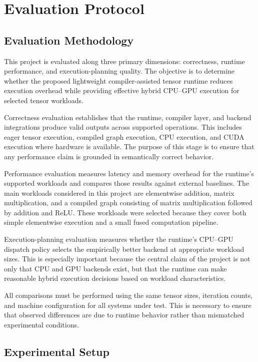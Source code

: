 \documentclass[12pt]{article}
\begin{document}
\section{Evaluation Protocol}

\subsection{Evaluation Methodology}

This project is evaluated along three primary dimensions: correctness, runtime performance, and execution-planning quality. The objective is to determine whether the proposed lightweight compiler-assisted tensor runtime reduces execution overhead while providing effective hybrid CPU--GPU execution for selected tensor workloads.

Correctness evaluation establishes that the runtime, compiler layer, and backend integrations produce valid outputs across supported operations. This includes eager tensor execution, compiled graph execution, CPU execution, and CUDA execution where hardware is available. The purpose of this stage is to ensure that any performance claim is grounded in semantically correct behavior.

Performance evaluation measures latency and memory overhead for the runtime's supported workloads and compares those results against external baselines. The main workloads considered in this project are elementwise addition, matrix multiplication, and a compiled graph consisting of matrix multiplication followed by addition and ReLU. These workloads were selected because they cover both simple elementwise execution and a small fused computation pipeline.

Execution-planning evaluation measures whether the runtime's CPU--GPU dispatch policy selects the empirically better backend at appropriate workload sizes. This is especially important because the central claim of the project is not only that CPU and GPU backends exist, but that the runtime can make reasonable hybrid execution decisions based on workload characteristics.

All comparisons must be performed using the same tensor sizes, iteration counts, and machine configuration for all systems under test. This is necessary to ensure that observed differences are due to runtime behavior rather than mismatched experimental conditions.

\subsection{Experimental Setup}
\end{document}
